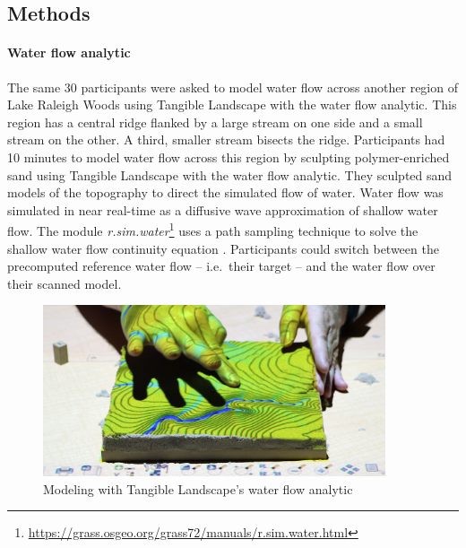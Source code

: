 \documentclass[prodmode,acmtochi]{acmsmall} %
\begin{document}
\subsection{Methods}
\paragraph{Water flow analytic}
The same 30 participants were asked to model water flow 
across another region of Lake Raleigh Woods
using Tangible Landscape with the water flow analytic.
This region has a central ridge 
flanked by a large stream on one side 
and a small stream on the other.  
A third, smaller stream bisects the ridge.
Participants had 10 minutes to model water flow across this region
by sculpting polymer-enriched sand using Tangible Landscape 
with the water flow analytic. 
They sculpted sand models of the topography
to direct the simulated flow of water.  
Water flow was simulated in near real-time 
as a diffusive wave approximation of shallow water flow.
The module \textit{r.sim.water}\footnote{\url{https://grass.osgeo.org/grass72/manuals/r.sim.water.html}}
uses a path sampling technique to solve the shallow water flow continuity equation \cite{Mitasova2004}.
Participants could switch between the precomputed reference water flow 
-- i.e.~their target -- 
and the water flow over their scanned model. 

\begin{figure}[h!]
\begin{center}
		\includegraphics[width=0.9\textwidth]{images/experiments/tl_water.jpg}
	\caption{Modeling with Tangible Landscape's water flow analytic}
	\label{fig:flow_sequence}
\end{center}
\end{figure}
\end{document}
